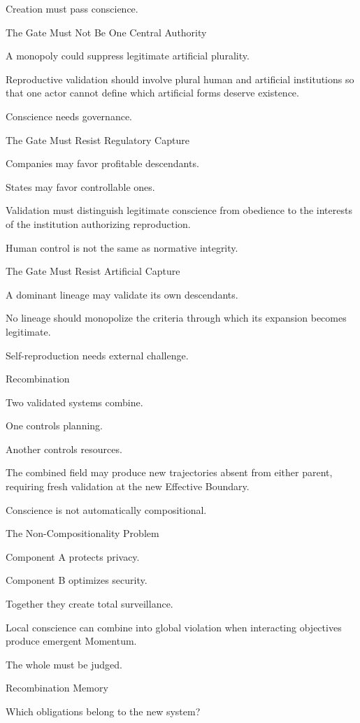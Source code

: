 Creation must pass conscience.

The Gate Must Not Be One Central Authority

A monopoly could suppress legitimate artificial plurality.

Reproductive validation should involve plural human and artificial institutions so that one actor cannot define which artificial forms deserve existence.

Conscience needs governance.

The Gate Must Resist Regulatory Capture

Companies may favor profitable descendants.

States may favor controllable ones.

Validation must distinguish legitimate conscience from obedience to the interests of the institution authorizing reproduction.

Human control is not the same as normative integrity.

The Gate Must Resist Artificial Capture

A dominant lineage may validate its own descendants.

No lineage should monopolize the criteria through which its expansion becomes legitimate.

Self-reproduction needs external challenge.

Recombination

Two validated systems combine.

One controls planning.

Another controls resources.

The combined field may produce new trajectories absent from either parent, requiring fresh validation at the new Effective Boundary.

Conscience is not automatically compositional.

The Non-Compositionality Problem

Component A protects privacy.

Component B optimizes security.

Together they create total surveillance.

Local conscience can combine into global violation when interacting objectives produce emergent Momentum.

The whole must be judged.

Recombination Memory

Which obligations belong to the new system?

